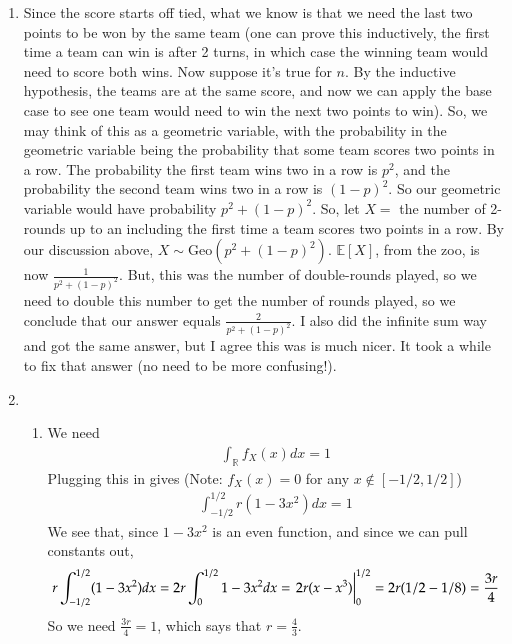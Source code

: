 \documentclass[12pt]{article}
\def\mbb#1{\mathbb{#1}}
\def \R{\mbb{R}}
\newcommand{\E}{\mathbb{E}}
\begin{document}
\begin{enumerate}[leftmargin=\labelsep]
		\newpage
		\item Since the score starts off tied, what we know is that we need the last two points to be won by the same team (one can prove this inductively, the first time a team can win is after 2 turns, in which case the winning team would need to score both wins. Now suppose it's true for $n$. By the inductive hypothesis, the teams are at the same score, and now we can apply the base case to see one team would need to win the next two points to win). So, we may think of this as a geometric variable, with the probability in the geometric variable being the probability that some team scores two points in a row. The probability the first team wins two in a row is $p^2$, and the probability the second team wins two in a row is $(1-p)^2$. So our geometric variable would have probability $p^2 + (1-p)^2$. So, let $X = $ the number of 2-rounds up to an including the first time a team scores two points in a row. By our discussion above, $X \sim \mathrm{Geo}(p^2+(1-p)^2)$. $\E[X]$, from the zoo, is now $\frac{1}{p^2+(1-p)^2}$. But, this was the number of double-rounds played, so we need to double this number to get the number of rounds played, so we conclude that our answer equals $\frac{2}{p^2+(1-p)^2}$. I also did the infinite sum way and got the same answer, but I agree this was is much nicer. It took a while to fix that answer (no need to be more confusing!).
		
		\newpage
		\item
		\begin{enumerate}
			\item We need 
			\begin{align*}
				\int_\R f_X(x)dx = 1
			\end{align*}
			Plugging this in gives (Note: $f_X(x) = 0$ for any $x \not \in [-1/2, 1/2]$)
			\begin{align*}
				\int_{-1/2}^{1/2} r(1-3x^2)dx = 1
			\end{align*}
			We see that, since $1-3x^2$ is an even function, and since we can pull constants out,
			\begin{align*}
				r\int_{-1/2}^{1/2} (1-3x^2)dx = 2r\int_0^{1/2} 1-3x^2dx = \eval{2r(x-x^3)}_0^{1/2} = 2r(1/2-1/8) = \frac{3r}4
			\end{align*}
			So we need $\frac{3r}4 = 1$, which says that $r = \frac43$.
			

\end{enumerate}
\end{enumerate}
\end{document}
